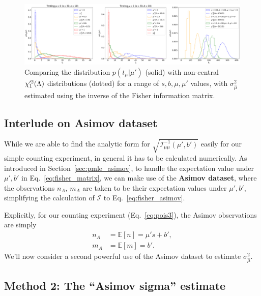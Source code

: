 \begin{figure}[htb]
  \centering
  \includegraphics[width=\textwidth]{figures/06-asymptotic-plr/2.png}
  \caption{Comparing the distribution $p(t_\mu|\mu')$ (solid) with non-central $\chi^{\prime 2}_1(\Lambda)$ distributions (dotted) for a range of $s, b, \mu, \mu'$ values, with $\sigma^2_{\hat\mu}$ estimated using the inverse of the Fisher information matrix.}
  \label{fig:ptmu_asym1}
\end{figure}


\subsection{Interlude on Asimov dataset}

While we are able to find the analytic form for $\sqrt{\mathcal I^{-1}_{\mu\mu}(\mu', b')}$ easily for our simple counting experiment, in general it has to be calculated numerically.
As introduced in Section~\ref{sec:pmle_asimov}, to handle the expectation value under $\mu', b'$ in Eq.~\ref{eq:fisher_matrix}, we can make use of the \textbf{Asimov dataset}, where the observations $n_A$, $m_A$ are taken to be their expectation values under $\mu', b'$, simplifying the calculation of $\mathcal I$ to Eq.~\ref{eq:fisher_asimov}.

Explicitly, for our counting experiment (Eq.~\ref{eq:pois3}), the Asimov observations are simply
\begin{align}
n_A &= \mathbb E[n] = \mu' s + b', \\
m_A &= \mathbb E[m] = b'.
\label{eq:asimov_data}
\end{align}
We'll now consider a second powerful use of the Asimov dataset to estimate $\sigma^2_{\hat\mu}$.

\subsection{Method 2: The ``Asimov sigma'' estimate}

